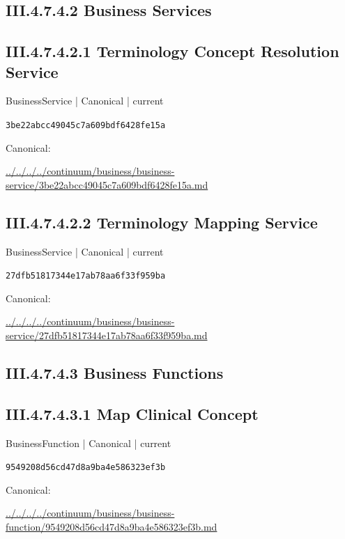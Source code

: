 \documentclass[10pt,a4paper]{article}
\begin{document}
\subsection*{III.4.7.4.2 Business Services}
\subsection*{III.4.7.4.2.1 Terminology Concept Resolution Service}
\label{element-3be22abcc49045c7a609bdf6428fe15a}
{\small BusinessService | Canonical | current}\par
\texttt{3be22abcc49045c7a609bdf6428fe15a}\par
Canonical: \par
{\footnotesize\url{../../../../continuum/business/business-service/3be22abcc49045c7a609bdf6428fe15a.md}}\par
\subsection*{III.4.7.4.2.2 Terminology Mapping Service}
\label{element-27dfb51817344e17ab78aa6f33f959ba}
{\small BusinessService | Canonical | current}\par
\texttt{27dfb51817344e17ab78aa6f33f959ba}\par
Canonical: \par
{\footnotesize\url{../../../../continuum/business/business-service/27dfb51817344e17ab78aa6f33f959ba.md}}\par
\subsection*{III.4.7.4.3 Business Functions}
\subsection*{III.4.7.4.3.1 Map Clinical Concept}
\label{element-9549208d56cd47d8a9ba4e586323ef3b}
{\small BusinessFunction | Canonical | current}\par
\texttt{9549208d56cd47d8a9ba4e586323ef3b}\par
Canonical: \par
{\footnotesize\url{../../../../continuum/business/business-function/9549208d56cd47d8a9ba4e586323ef3b.md}}\par
\end{document}
